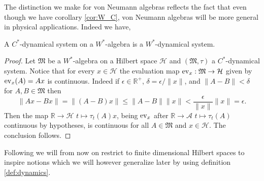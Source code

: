 The distinction we make for von Neumann algebras reflects the fact that even though we have corollary \ref{cor:W_C}, von Neumann algebras will be more general in physical applications. Indeed we have,

\begin{theorem}\label{thm:C_W}
A $C^*$-dynamical system on a $W^*$-algebra is a $W^*$-dynamical system.
\end{theorem}

\begin{proof}
Let $\mathfrak{M}$ be a $W^*$-algebra on a Hilbert space $\mathcal{H}$ and $(\mathfrak{M},\tau)$ a $C^*$-dynamical system. Notice that for every $x\in\mathcal{H}$ the evaluation map $\operatorname{ev}_{x}:\mathfrak{M}\rightarrow \mathcal{H}$ given by $\operatorname{ev}_{x}(A)=Ax$ is continuous. Indeed if $\epsilon\in\mathbb{R}^+$, $\delta=\epsilon/\|x\|$, and $\|A-B\|<\delta$ for $A,B\in\mathfrak{M}$ then
\begin{equation}
\|Ax-Bx\|=\|(A-B)x\|\leq\|A-B\|\|x\|<\frac{\epsilon}{\|x\|}\|x\|=\epsilon.
\end{equation}
Then the map $\mathbb{R}\rightarrow\mathcal{H}$ $t\mapsto\tau_t(A)x$, being $\operatorname{ev}_{x}$ after $\mathbb{R}\rightarrow\mathcal{A}$ $t\mapsto\tau_t(A)$ continuous by hypotheses, is continuous for all $A\in\mathfrak{M}$ and $x\in\mathcal{H}$. The conclusion follows.
\end{proof}

Following \cite{Duvenhage1999} we will from now on restrict to finite dimensional Hilbert spaces to inspire notions which we will however generalize later by using definition \ref{def:dynamics}.

